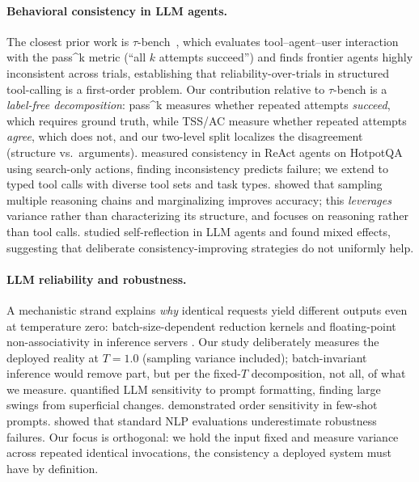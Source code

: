 \documentclass[11pt]{article}
\newcommand{\passk}{pass\textasciicircum k}
\begin{document}
\paragraph{Behavioral consistency in LLM agents.}
The closest prior work is $\tau$-bench~\citep{yao2024taubench}, which
evaluates tool--agent--user interaction with the \passk{} metric (``all $k$
attempts succeed'') and finds frontier agents highly inconsistent across
trials, establishing that reliability-over-trials in structured
tool-calling is a first-order problem. Our contribution relative to
$\tau$-bench is a \emph{label-free decomposition}: \passk{} measures
whether repeated attempts \emph{succeed}, which requires ground truth, while
TSS/AC measure whether repeated attempts \emph{agree}, which does not, and
our two-level split localizes the disagreement (structure vs.\ arguments).
\citet{mehta2026disagree} measured consistency in ReAct agents on HotpotQA
using search-only actions, finding inconsistency predicts failure; we extend
to typed tool calls with diverse tool sets and task types.
\citet{wang2023selfconsistency} showed that sampling multiple reasoning chains and
marginalizing improves accuracy; this \emph{leverages} variance rather than
characterizing its structure, and focuses on reasoning rather than tool calls.
\citet{renze2024self} studied self-reflection in LLM agents and found mixed
effects, suggesting that deliberate consistency-improving strategies do not
uniformly help.

\paragraph{LLM reliability and robustness.}
A mechanistic strand explains \emph{why} identical requests yield different
outputs even at temperature zero: batch-size-dependent reduction kernels and
floating-point non-associativity in inference servers
\citep{thinking2025nondeterminism,atil2024nondeterminism}. Our study
deliberately measures the deployed reality at $T{=}1.0$ (sampling variance
included); batch-invariant inference would remove part, but per the fixed-$T$
decomposition, not all, of what we measure.
\citet{sclar2024quantifying} quantified LLM sensitivity to prompt formatting,
finding large swings from superficial changes.
\citet{lu2022fantastically} demonstrated order sensitivity in few-shot prompts.
\citet{perez2022true} showed that standard NLP evaluations underestimate
robustness failures.
Our focus is orthogonal: we hold the input fixed and measure variance across
repeated identical invocations, the consistency a deployed system must have by
definition.
\end{document}
